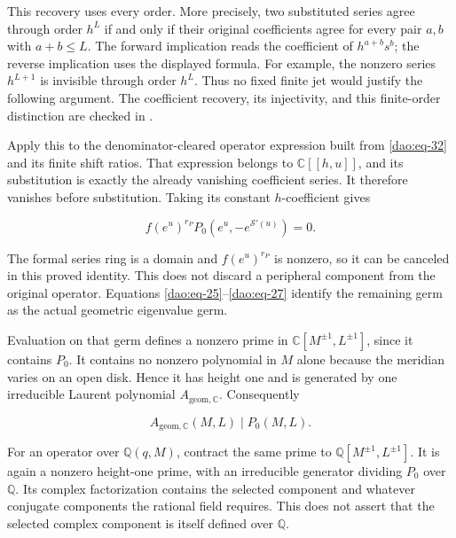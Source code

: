 This recovery uses every order. More precisely, two substituted series
agree through order $h^L$ if and only if their original coefficients
agree for every pair $a,b$ with $a+b\le L$. The forward implication
reads the coefficient of $h^{a+b}s^b$; the reverse implication uses
the displayed formula. For example, the nonzero series $h^{L+1}$ is
invisible through order $h^L$. Thus no fixed finite jet would justify
the following argument. The coefficient recovery, its injectivity,
and this finite-order distinction are checked in
.

Apply this to the denominator-cleared operator expression built from
\eqref{dao:eq-32} and its finite shift ratios. That expression belongs
to \(\mathbb C[[h,u]]\), and its substitution is exactly the already
vanishing coefficient series. It therefore vanishes before substitution.
Taking its constant \(h\)-coefficient gives

\begin{equation}\label{dao:eq-33}
f(e^u)^{r_P}P_0(e^u,-e^{\mathcal S'(u)})=0.
\end{equation}

The formal series ring is a domain and \(f(e^u)^{r_P}\) is nonzero, so it can be canceled in this proved identity. This does not discard a peripheral component from the original operator. Equations \eqref{dao:eq-25}--\eqref{dao:eq-27} identify the remaining germ as the actual geometric eigenvalue germ.

Evaluation on that germ defines a nonzero prime in \(\mathbb C[M^{\pm1},L^{\pm1}]\), since it contains \(P_0\). It contains no nonzero polynomial in \(M\) alone because the meridian varies on an open disk. Hence it has height one and is generated by one irreducible Laurent polynomial \(A_{\mathrm{geom},\mathbb C}\). Consequently

\begin{equation}\label{dao:eq-34}
A_{\mathrm{geom},\mathbb C}(M,L)\mid P_0(M,L).
\end{equation}

For an operator over \(\mathbb Q(q,M)\), contract the same prime to \(\mathbb Q[M^{\pm1},L^{\pm1}]\). It is again a nonzero height-one prime, with an irreducible generator dividing \(P_0\) over \(\mathbb Q\). Its complex factorization contains the selected component and whatever conjugate components the rational field requires. This does not assert that the selected complex component is itself defined over \(\mathbb Q\).

